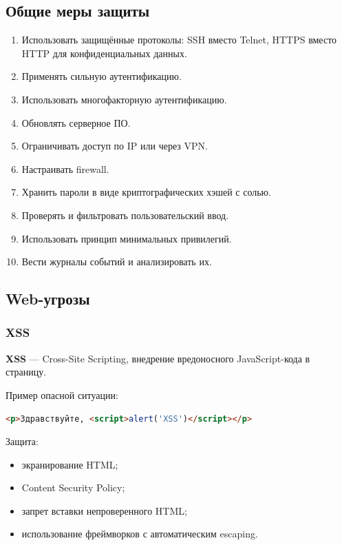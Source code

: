 \documentclass[12pt,a4paper]{article}
\begin{document}
\subsection{Общие меры защиты}

\begin{enumerate}
    \item Использовать защищённые протоколы: SSH вместо Telnet, HTTPS вместо HTTP для конфиденциальных данных.
    \item Применять сильную аутентификацию.
    \item Использовать многофакторную аутентификацию.
    \item Обновлять серверное ПО.
    \item Ограничивать доступ по IP или через VPN.
    \item Настраивать firewall.
    \item Хранить пароли в виде криптографических хэшей с солью.
    \item Проверять и фильтровать пользовательский ввод.
    \item Использовать принцип минимальных привилегий.
    \item Вести журналы событий и анализировать их.
\end{enumerate}

\subsection{Web-угрозы}

\subsubsection{XSS}

\textbf{XSS} --- Cross-Site Scripting, внедрение вредоносного JavaScript-кода в страницу.

Пример опасной ситуации:
\begin{lstlisting}[language=HTML]
<p>Здравствуйте, <script>alert('XSS')</script></p>
\end{lstlisting}

Защита:
\begin{itemize}
    \item экранирование HTML;
    \item Content Security Policy;
    \item запрет вставки непроверенного HTML;
    \item использование фреймворков с автоматическим escaping.
\end{itemize}
\end{document}
